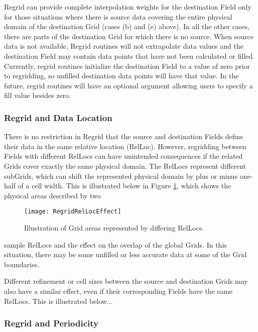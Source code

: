 Regrid can provide complete interpolation weights for the destination Field
only for those situations where there is source data covering the entire physical
domain of the destination Grid (cases (b) and (e) above).  In all the other
cases, there are parts of the destination Grid for which there is no source. 
When source data is not available, Regrid routines will not extrapolate data
values and the destination Field may contain data points that have not been
calculated or filled.  Currently, regrid routines initialize the destination
Field to a value of zero prior to regridding, so unfilled destination data points
will have that value.  In the future, regrid routines will have an optional
argument allowing users to specify a fill value besides zero.  


\subsubsection{Regrid and Data Location}

There is no restriction in Regrid that the source and destination Fields
define their data in the same relative location (RelLoc).  However, regridding
between Fields with different RelLocs can have unintended consequences if the
related Grids cover exactly the same physical domain.  The RelLocs represent
different subGrids, which can shift the represented physical domain by plus or
minus one-half of a cell width.  This is illustrated below in Figure 
\ref{fig:RegridRelLocEffect}, which shows the physical areas described by two

\begin{center}
\begin{figure}
\caption{Illustration of Grid areas represented by differing RelLocs. }
\label{fig:RegridRelLocEffect}
\resizebox{\textwidth}{!}
  {\texttt{[image: RegridRelLocEffect]}}
\end{figure}
\end{center}

sample RelLocs and the effect on the overlap of the global Grids.  In this
situation, there may be some unfilled or less accurate data at some of the
Grid boundaries.

Different refinement or cell sizes between the source and destination Grids
may also have a similar effect, even if their corresponding Fields have the
same RelLocs.  This is illustrated below...


\subsubsection{Regrid and Periodicity}



